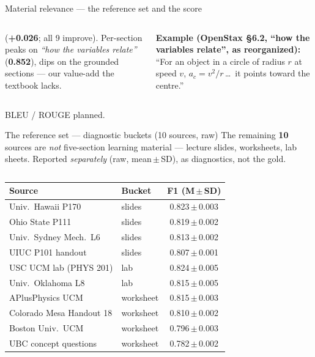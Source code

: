 \documentclass[aspectratio=169,10pt]{beamer}
\newcommand{\hl}[1]{{\bfseries\color{cAccent}#1}}
\begin{document}
\begin{frame}{Material relevance --- the reference set and the score}
\begin{columns}[T]
{(\hl{+0.026}; all 9 improve). Per-section peaks on \emph{``how the variables relate''} (\hl{0.852}),
dips on the grounded sections --- our value-add the textbook lacks.}\\[3pt]
\begin{tcolorbox}[colback=cMeas!5,colframe=cMeas!45,boxrule=0.3pt,left=3pt,right=3pt,top=2pt,bottom=2pt]
{\tiny\textbf{Example (OpenStax \S6.2, ``how the variables relate'', as reorganized):} ``For an object
in a circle of radius $r$ at speed $v$, $a_c=v^2/r$\,\dots\ it points toward the centre.''}
\end{tcolorbox}
\end{columns}
\vspace{0.2em}
{\scriptsize BLEU / ROUGE planned.}
\end{frame}

\begin{frame}{The reference set --- diagnostic buckets (10 sources, raw)}
\scriptsize
The remaining \hl{10} sources are \emph{not} five-section learning material --- lecture slides,
worksheets, lab sheets. Reported \emph{separately} (raw, mean\,$\pm$\,SD), as diagnostics, not the gold.
\vspace{0.2em}
\begin{columns}[T]
{\tiny
\begin{tabular}{llc}
\toprule
\textbf{Source} & \textbf{Bucket} & \textbf{F1 (M\,$\pm$\,SD)} \\
\midrule
Univ.\ Hawaii P170       & slides    & 0.823\,$\pm$\,0.003 \\
Ohio State P111          & slides    & 0.819\,$\pm$\,0.002 \\
Univ.\ Sydney Mech.\ L6   & slides    & 0.813\,$\pm$\,0.002 \\
UIUC P101 handout        & slides    & 0.807\,$\pm$\,0.001 \\
\midrule
USC UCM lab (PHYS 201)   & lab       & 0.824\,$\pm$\,0.005 \\
Univ.\ Oklahoma L8        & lab       & 0.815\,$\pm$\,0.005 \\
\midrule
APlusPhysics UCM         & worksheet & 0.815\,$\pm$\,0.003 \\
Colorado Mesa Handout 18 & worksheet & 0.810\,$\pm$\,0.002 \\
Boston Univ.\ UCM         & worksheet & 0.796\,$\pm$\,0.003 \\
UBC concept questions    & worksheet & 0.782\,$\pm$\,0.002 \\
\bottomrule
\end{tabular}}

\end{columns}
\end{frame}
\end{document}
